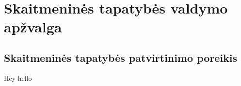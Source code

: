 \section{Skaitmeninės tapatybės valdymo apžvalga}

\subsection{Skaitmeninės tapatybės patvirtinimo poreikis}

Hey hello